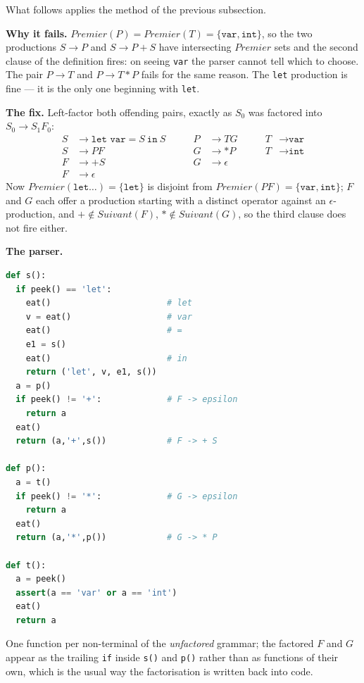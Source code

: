 \begin{example}
  What follows applies the method of the previous subsection.

  \medskip
  \textbf{Why it fails.} $\mathit{Premier}(P) = \mathit{Premier}(T) =
  \{\texttt{var}, \texttt{int}\}$, so the two productions $S \to P$ and
  $S \to P+S$ have intersecting $\mathit{Premier}$ sets and the second clause of
  the definition fires: on seeing \verb|var| the parser cannot tell which to
  choose. The pair $P \to T$ and $P \to T*P$ fails for the same reason. The
  \verb|let| production is fine --- it is the only one beginning with
  \verb|let|.

  \medskip
  \textbf{The fix.} Left-factor both offending pairs, exactly as $S_{0}$ was
  factored into $S_{0} \to S_{1}F_{0}$:
  \[
    \begin{aligned}
      S &\to \texttt{let var} = S\ \texttt{in}\ S & \qquad P &\to T G     & \qquad T &\to \texttt{var} \\
      S &\to P F                                  & \qquad G &\to *P      & \qquad T &\to \texttt{int} \\
      F &\to +S                                   & \qquad G &\to \epsilon &         & \\
      F &\to \epsilon                             &          &            &          &
    \end{aligned}
  \]
  Now $\mathit{Premier}(\texttt{let} \dots) = \{\texttt{let}\}$ is disjoint from
  $\mathit{Premier}(PF) = \{\texttt{var},\texttt{int}\}$; $F$ and $G$ each offer
  a production starting with a distinct operator against an
  $\epsilon$-production, and $+ \notin \mathit{Suivant}(F)$,
  $* \notin \mathit{Suivant}(G)$, so the third clause does not fire either.

  \medskip
  \textbf{The parser.}
\begin{lstlisting}[language=Python]
def s():
  if peek() == 'let':
    eat()                       # let
    v = eat()                   # var
    eat()                       # =
    e1 = s()
    eat()                       # in
    return ('let', v, e1, s())
  a = p()
  if peek() != '+':             # F -> epsilon
    return a
  eat()
  return (a,'+',s())            # F -> + S

def p():
  a = t()
  if peek() != '*':             # G -> epsilon
    return a
  eat()
  return (a,'*',p())            # G -> * P

def t():
  a = peek()
  assert(a == 'var' or a == 'int')
  eat()
  return a
\end{lstlisting}
  One function per non-terminal of the \emph{unfactored} grammar; the factored
  $F$ and $G$ appear as the trailing \verb|if| inside \verb|s()| and \verb|p()|
  rather than as functions of their own, which is the usual way the
  factorisation is written back into code.
\end{example}

